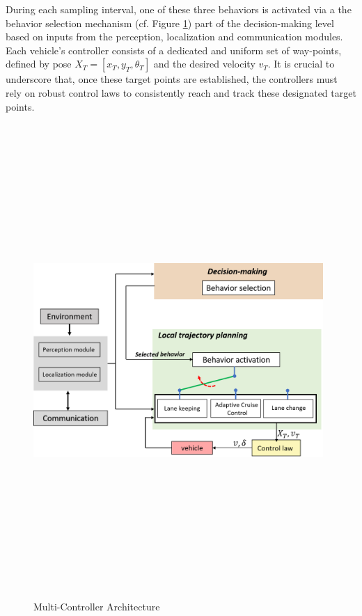 During each sampling interval, one of these three behaviors is activated via a the behavior selection mechanism (cf. Figure \ref{fig:MCA}) part of the decision-making level based on inputs from the perception, localization and communication modules. Each vehicle's controller consists of a dedicated and uniform set of way-points, defined by pose  $X_T=[x_T, y_T, \theta_T]$ and the desired velocity $v_T$. It is crucial to underscore that, once these target points are established, the controllers must rely on robust control laws to consistently reach and track these designated target points. 

        \begin{figure}[!h]
        \centering 
        \includegraphics[width=11cm,height=18cm,keepaspectratio]{chapters/Chapitre_4/Figures/Adapted_control_architecture.png}
        \caption{Multi-Controller Architecture}
        \label{fig:MCA}
        \end{figure}







